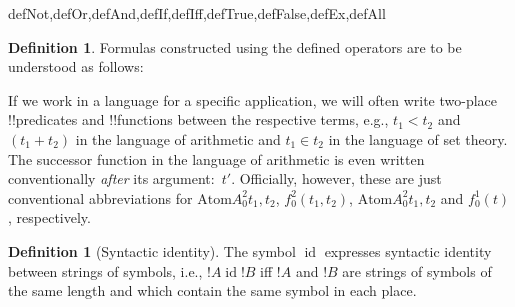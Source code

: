 \documentclass[10pt,a4paper]{article}
\makeatletter
\theoremstyle{plain}
\theoremstyle{definition}
\newtheorem{defn}[thm]{Definition}
\theoremstyle{remark}
\providecommand{\lif}{\mathbin{\rightarrow}}
\providecommand{\lforall}{\mathord{\forall}}
\providecommand{\lexists}{\mathord{\exists}}
\providecommand{\ltrue}{\top}
\providecommand{\lfalse}{\bot}
\providecommand{\Obj}{}
\providecommand{\iftag}[1]{#1}
\providecommand{\tagitem}[1]{\item[#1]}
\providecommand{\liff}{\mathbin{\leftrightarrow}}
\providecommand{\Atom}{\mathrm{Atom}}
\providecommand{\ident}{\operatorname{id}}
\providecommand{\iftag}{}
\def\iftag#1#2#3{\iftag@stop{#2}\iftag@more}
\def\iftag@more{\@ifnextchar\bgroup{\iftag@eat}{\relax}}
\def\iftag@eat#1{}
\def\iftag@stop#1{#1}
\makeatother
\begin{document}
\begin{tagblock}{defNot,defOr,defAnd,defIf,defIff,defTrue,defFalse,defEx,defAll}
\begin{defn}
Formulas constructed using the defined operators are to be understood
as follows:

\end{defn}
\end{tagblock}

If we work in a language for a specific application, we will often
write two-place !!{predicate}s and !!{function}s between the
respective terms, e.g., $t_1 < t_2$ and $(t_1 + t_2)$ in the language
of arithmetic and $t_1 \in t_2$ in the language of set theory.  The
successor function in the language of arithmetic is even written
conventionally \emph{after} its argument:~$t'$.  Officially, however,
these are just conventional abbreviations for $\Atom{\Obj A^2_0}{t_1, t_2}$,
$\Obj f^2_0(t_1, t_2)$, $\Atom{\Obj A^2_0}{t_1, t_2}$ and $f^1_0(t)$,
respectively.

\begin{defn}[Syntactic identity]
The symbol $\ident$ expresses syntactic identity between strings of
symbols, i.e., $!A \ident !B$ iff $!A$ and $!B$ are strings of symbols
of the same length and which contain the same symbol in each place.
\end{defn}
\end{document}
